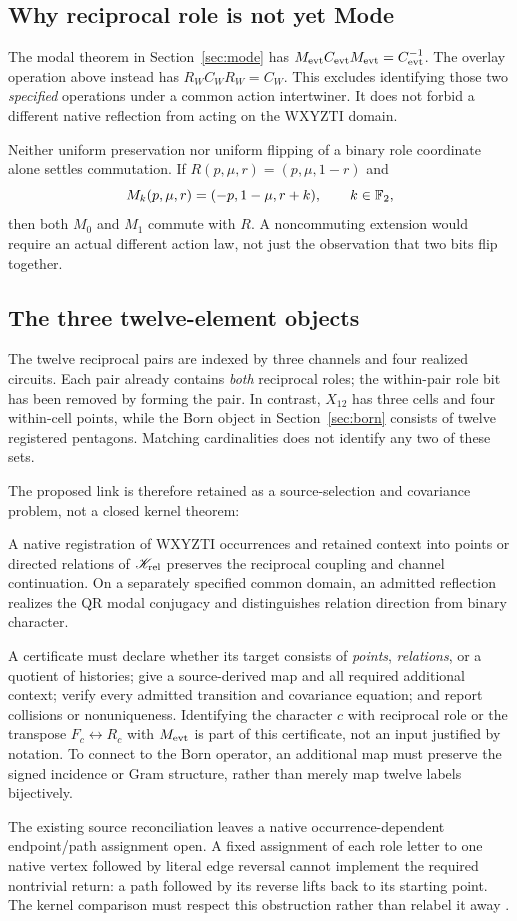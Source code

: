 \subsection*{Why reciprocal role is not yet Mode}
The modal theorem in Section~\ref{sec:mode} has $M_{\mathrm{evt}}C_{\mathrm{evt}}M_{\mathrm{evt}}=C_{\mathrm{evt}}^{-1}$. The overlay operation above instead has $R_WC_WR_W=C_W$. This excludes identifying those two \emph{specified} operations under a common action intertwiner. It does not forbid a different native reflection from acting on the WXYZTI domain.

Neither uniform preservation nor uniform flipping of a binary role coordinate alone settles commutation. If $R(p,\mu,r)=(p,\mu,1-r)$ and
\[
M_k(p,\mu,r)=(-p,1-\mu,r+k),\qquad k\in\mathbb F_2,
\]
then both $M_0$ and $M_1$ commute with $R$. A noncommuting extension would require an actual different action law, not just the observation that two bits flip together.

\subsection*{The three twelve-element objects}
The twelve reciprocal pairs are indexed by three channels and four realized circuits. Each pair already contains \emph{both} reciprocal roles; the within-pair role bit has been removed by forming the pair. In contrast, $X_{12}$ has three cells and four within-cell points, while the Born object in Section~\ref{sec:born} consists of twelve registered pentagons. Matching cardinalities does not identify any two of these sets.

The proposed link is therefore retained as a source-selection and covariance problem, not a closed kernel theorem:
\begin{hypothesis}\label{hyp:wxyzti-kernel}
A native registration of WXYZTI occurrences and retained context into points or directed relations of $\mathscr K_{\rm rel}$ preserves the reciprocal coupling and channel continuation. On a separately specified common domain, an admitted reflection realizes the QR modal conjugacy and distinguishes relation direction from binary character.
\end{hypothesis}
A certificate must declare whether its target consists of \emph{points}, \emph{relations}, or a quotient of histories; give a source-derived map and all required additional context; verify every admitted transition and covariance equation; and report collisions or nonuniqueness. Identifying the character $c$ with reciprocal role or the transpose $F_c\leftrightarrow R_c$ with $M_{\mathrm{evt}}$ is part of this certificate, not an input justified by notation. To connect to the Born operator, an additional map must preserve the signed incidence or Gram structure, rather than merely map twelve labels bijectively.

The existing source reconciliation leaves a native occurrence-dependent endpoint/path assignment open. A fixed assignment of each role letter to one native vertex followed by literal edge reversal cannot implement the required nontrivial return: a path followed by its reverse lifts back to its starting point. The kernel comparison must respect this obstruction rather than relabel it away \citep{wxyzticontract}.
\endgroup
\setcounter{section}{13}
